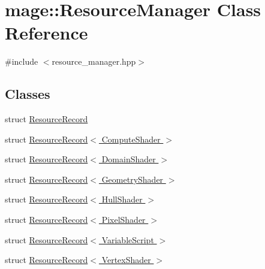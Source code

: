 \hypertarget{classmage_1_1_resource_manager}{}\section{mage\+:\+:Resource\+Manager Class Reference}
\label{classmage_1_1_resource_manager}


{\ttfamily \#include $<$resource\+\_\+manager.\+hpp$>$}

\subsection*{Classes}
\begin{DoxyCompactItemize}
\item 
struct \hyperlink{structmage_1_1_resource_manager_1_1_resource_record}{Resource\+Record}
\item 
struct \hyperlink{structmage_1_1_resource_manager_1_1_resource_record_3_01_compute_shader_01_4}{Resource\+Record$<$ Compute\+Shader $>$}
\item 
struct \hyperlink{structmage_1_1_resource_manager_1_1_resource_record_3_01_domain_shader_01_4}{Resource\+Record$<$ Domain\+Shader $>$}
\item 
struct \hyperlink{structmage_1_1_resource_manager_1_1_resource_record_3_01_geometry_shader_01_4}{Resource\+Record$<$ Geometry\+Shader $>$}
\item 
struct \hyperlink{structmage_1_1_resource_manager_1_1_resource_record_3_01_hull_shader_01_4}{Resource\+Record$<$ Hull\+Shader $>$}
\item 
struct \hyperlink{structmage_1_1_resource_manager_1_1_resource_record_3_01_pixel_shader_01_4}{Resource\+Record$<$ Pixel\+Shader $>$}
\item 
struct \hyperlink{structmage_1_1_resource_manager_1_1_resource_record_3_01_variable_script_01_4}{Resource\+Record$<$ Variable\+Script $>$}
\item 
struct \hyperlink{structmage_1_1_resource_manager_1_1_resource_record_3_01_vertex_shader_01_4}{Resource\+Record$<$ Vertex\+Shader $>$}
\end{DoxyCompactItemize}
